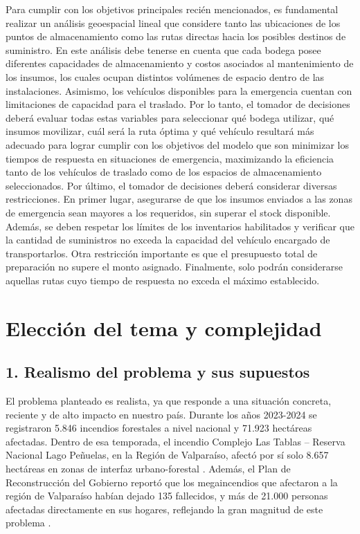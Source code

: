\documentclass[letterpaper]{article}
\begin{document}
\begin{flushleft}
Para cumplir con los objetivos principales reci\'en mencionados, es fundamental realizar un an\'alisis geoespacial lineal que considere tanto las ubicaciones de los puntos de almacenamiento como las rutas directas hacia los posibles destinos de suministro. En este an\'alisis debe tenerse en cuenta que cada bodega posee diferentes capacidades de almacenamiento y costos asociados al mantenimiento de los insumos, los cuales ocupan distintos vol\'umenes de espacio dentro de las instalaciones. Asimismo, los veh\'iculos disponibles para la emergencia cuentan con limitaciones de capacidad para el traslado. Por lo tanto, el tomador de decisiones deber\'a evaluar todas estas variables para seleccionar qu\'e bodega utilizar, qu\'e insumos movilizar, cu\'al ser\'a la ruta \'optima y qu\'e veh\'iculo resultar\'a m\'as adecuado para lograr cumplir con los objetivos del modelo que son minimizar los tiempos de respuesta en situaciones de emergencia, maximizando la eficiencia tanto de los veh\'iculos de traslado como de los espacios de almacenamiento seleccionados. Por \'ultimo, el tomador de decisiones deber\'a considerar diversas restricciones. En primer lugar, asegurarse de que los insumos enviados a las zonas de emergencia sean mayores a los requeridos, sin superar el stock disponible. Adem\'as, se deben respetar los l\'imites de los inventarios habilitados y verificar que la cantidad de suministros no exceda la capacidad del veh\'iculo encargado de transportarlos. Otra restricci\'on importante es que el presupuesto total de preparaci\'on no supere el monto asignado. Finalmente, solo podr\'an considerarse aquellas rutas cuyo tiempo de respuesta no exceda el m\'aximo establecido.

\section{Elecci\'on del tema y complejidad}

\subsection{1. Realismo del problema y sus supuestos}
El problema planteado es realista, ya que responde a una situaci\'on concreta, reciente y de alto impacto en nuestro pa\'is. Durante los a\~nos 2023-2024 se registraron 5.846 incendios forestales a nivel nacional y 71.923 hect\'areas afectadas. Dentro de esa temporada, el incendio Complejo Las Tablas – Reserva Nacional Lago Pe\~nuelas, en la Regi\'on de Valpara\'iso, afect\'o por s\'i solo 8.657 hect\'areas en zonas de interfaz urbano-forestal \cite{CONAF2024}. Adem\'as, el Plan de Reconstrucci\'on del Gobierno report\'o que los megaincendios que afectaron a la regi\'on de Valpara\'iso hab\'ian dejado 135 fallecidos, y m\'as de 21.000 personas afectadas directamente en sus hogares, reflejando la gran magnitud de este problema \cite{MinDesarrollo2024-1}.\\


\end{flushleft}
\end{document}
